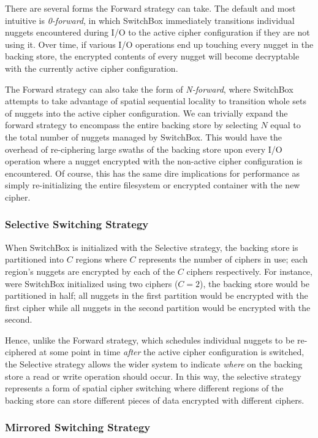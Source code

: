 There are several forms the Forward strategy can take. The default and most
intuitive is \emph{0-forward}, in which SwitchBox immediately transitions
individual nuggets encountered during I/O to the active cipher configuration if
they are not using it. Over time, if various I/O operations end up touching
every nugget in the backing store, the encrypted contents of every nugget will
become decryptable with the currently active cipher configuration.

The Forward strategy can also take the form of \emph{N-forward}, where SwitchBox
attempts to take advantage of spatial sequential locality to transition whole
sets of nuggets into the active cipher configuration. We can trivially expand
the forward strategy to encompass the entire backing store by selecting $N$
equal to the total number of nuggets managed by SwitchBox. This would have the
overhead of re-ciphering large swaths of the backing store upon every I/O
operation where a nugget encrypted with the non-active cipher configuration is
encountered. Of course, this has the same dire implications for performance as
simply re-initializing the entire filesystem or encrypted container with the new
cipher.

\subsubsection{Selective Switching Strategy}

When SwitchBox is initialized with the Selective strategy, the backing store is
partitioned into $C$ regions where $C$ represents the number of ciphers in use;
each region's nuggets are encrypted by each of the $C$ ciphers respectively. For
instance, were SwitchBox initialized using two ciphers ($C = 2$), the backing
store would be partitioned in half; all nuggets in the first partition would be
encrypted with the first cipher while all nuggets in the second partition would
be encrypted with the second.

Hence, unlike the Forward strategy, which schedules individual nuggets to be
re-ciphered at some point in time \emph{after} the active cipher configuration
is switched, the Selective strategy allows the wider system to indicate
\emph{where} on the backing store a read or write operation should occur. In
this way, the selective strategy represents a form of spatial cipher switching
where different regions of the backing store can store different pieces of data
encrypted with different ciphers.

\subsubsection{Mirrored Switching Strategy}

